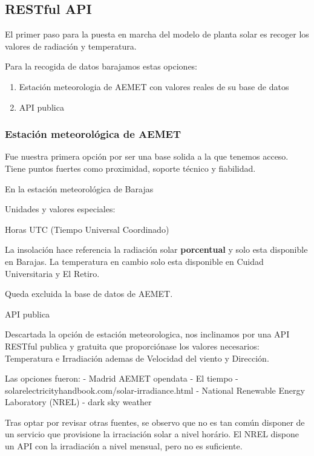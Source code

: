 \subsection{RESTful API} 
\label{sub:API}
El primer paso para la puesta en marcha del modelo de planta solar es recoger los valores de radiación y temperatura.

Para la recogida de datos barajamos estas opciones:
\begin{enumerate}
    \item Estación meteorologia de AEMET con valores reales de su base de datos
    \item API publica
\end{enumerate}


\subsubsection{Estación meteorológica de AEMET}
\label{ssub:estación_meteorológica_de_aemet}

Fue nuestra primera opción por ser una base solida a la que tenemos acceso. Tiene puntos fuertes como proximidad, soporte técnico y fiabilidad.

En la estación meteorológica de Barajas



Unidades y valores especiales:

Horas UTC (Tiempo Universal Coordinado)


La insolación hace referencia la radiación solar \textbf{porcentual} y solo esta disponible en Barajas.
La temperatura en cambio solo esta disponible en Cuidad Universitaria y El Retiro.

Queda excluida la base de datos de AEMET.

API publica

Descartada la opción de estación meteorologica, nos inclinamos por una API RESTful publica y gratuita que proporciónase los valores necesarios: Temperatura e Irradiación ademas de Velocidad del viento y Dirección.

Las opciones fueron:
- Madrid AEMET opendata
- El tiempo
- solarelectricityhandbook.com/solar-irradiance.html
- National Renewable Energy Laboratory (NREL)
- dark sky weather

Tras optar por revisar otras fuentes, se observo que no es tan común disponer de un servicio que provisione la irraciación solar a nivel horário. El NREL dispone un API con la irradiación a nivel mensual, pero no es suficiente.

